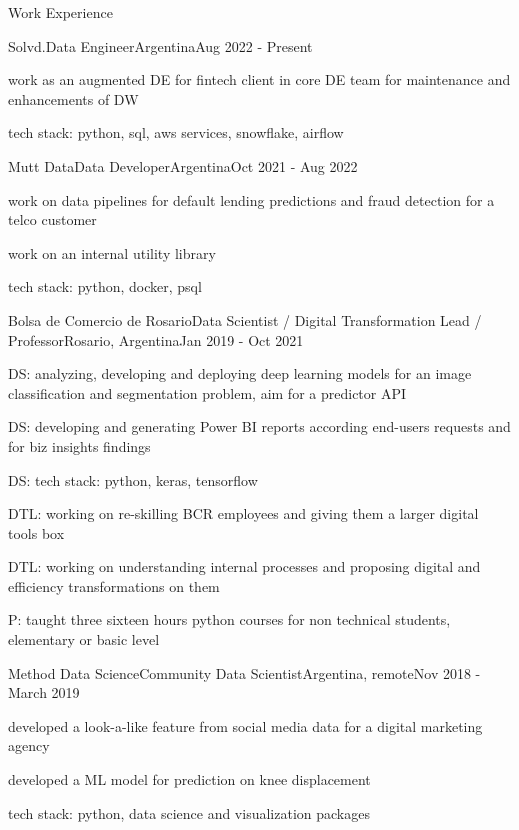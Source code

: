 \documentclass{article}
\newlength{\tabin}
\newlength{\secsep}
\newcommand{\lineunder}{\vspace*{-8pt} \\ \hspace*{-6pt} \hrulefill \\ \vspace*{-15pt}}
\newenvironment{tabbedsection}[1]{
  \begin{list}{}{
      \setlength{\itemsep}{0pt}
      \setlength{\labelsep}{0pt}
      \setlength{\labelwidth}{0pt}
      \setlength{\leftmargin}{\tabin}
      \setlength{\rightmargin}{\tabin}
      \setlength{\listparindent}{0pt}
      \setlength{\parsep}{0pt}
      \setlength{\parskip}{0pt}
      \setlength{\partopsep}{0pt}
      \setlength{\topsep}{#1}
    }
  \item[]
}{\end{list}}
\newenvironment{resume_section}[1]{
  \filbreak
  \vspace{2\secsep}
  \textsc{\large#1}
  \lineunder
  \begin{tabbedsection}{\secsep}
}{\end{tabbedsection}}
\newenvironment{subitems}{
  \renewcommand{\labelitemi}{-}
  \begin{itemize}
      \setlength{\labelsep}{1em}
}{\end{itemize}}
\newenvironment{resume_employer}[4]{
  \vspace{\secsep}
  \textbf{#1} \\ 
  \indent {\small #2} \hfill {\footnotesize#3 (#4)}
  \begin{tabbedsection}{0pt}
  \begin{subitems}
}{\end{subitems}\end{tabbedsection}}
\begin{document}
\begin{resume_section}{Work Experience}
  \begin{resume_employer}{Solvd.}{Data Engineer}{Argentina}{Aug 2022 - Present}
    \item work as an augmented DE for fintech client in core DE team for maintenance and enhancements of DW
    \item tech stack: python, sql, aws services, snowflake, airflow
  \end{resume_employer}
  
  \begin{resume_employer}{Mutt Data}{Data Developer}{Argentina}{Oct 2021 - Aug 2022}
    \item work on data pipelines for default lending predictions and fraud detection for a telco customer
    \item work on an internal utility library
    \item tech stack: python, docker, psql
  \end{resume_employer}

  \begin{resume_employer}{Bolsa de Comercio de Rosario}{Data Scientist / Digital Transformation Lead / Professor}{Rosario, Argentina}{Jan 2019 - Oct 2021}
    \item DS: analyzing, developing and deploying deep learning models for an image classification and segmentation problem, aim for a predictor API 
    \item DS: developing and generating Power BI reports according end-users requests and for biz insights findings
    \item DS: tech stack: python, keras, tensorflow
    \item DTL: working on re-skilling BCR employees and giving them a larger digital tools box
    \item DTL: working on understanding internal processes and proposing digital and efficiency transformations on them
    \item P: taught three sixteen hours python courses for non technical students, elementary or basic level
  \end{resume_employer}
  
  \begin{resume_employer}{Method Data Science}{Community Data Scientist}{Argentina, remote}{Nov 2018 - March 2019}
    \item developed a look-a-like feature from social media data for a digital marketing agency
    \item developed a ML model for prediction on knee displacement
    \item tech stack: python, data science and visualization packages
  \end{resume_employer}
  

\end{resume_section}
\end{document}
